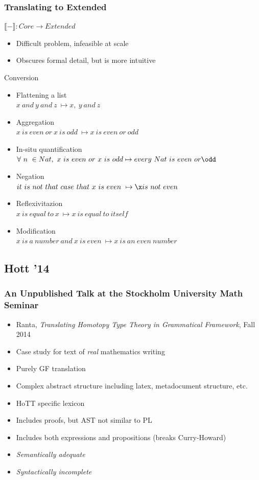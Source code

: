 \documentclass[9pt]{beamer}
\begin{document}
\begin{frame}
\frametitle{Translating to Extended}

$\llbracket - \rrbracket : Core \to Extended$
\begin{itemize}
\item Difficult problem, infeasible at scale
\item Obscures formal detail, but is more intuitive 
\end{itemize}

\begin{exampleblock}{Conversion}
\begin{itemize}

\item Flattening a list \\
  $x\ and\ y\ and\ z\ \mapsto x,\ y\ and\ z$
\item Aggregation \\
  $x\ is\ even\ or\ x\ is\ odd\ \mapsto x\ is\ even\ or\ odd$
\item In-situ quantification \\
  $\forall\ n\ \in Nat,\ x\ is\ even\ or\ x\ is\ odd \mapsto every\ Nat\ is\ even\ or \odd$
\item Negation \\
  $it\ is\ not\ that\ case\ that\ x\ is\ even\ \mapsto \x is\ not\ even$
\item Reflexivitazion \\
  $x\ is\ equal\ to\ x\ \mapsto x\ is\ equal\ to\ itself$
\item Modification \\
  $x\ is\ a\ number\ and\ x\ is\ even\ \mapsto x\ is\ an\ even\ number$
\end{itemize}
\end{exampleblock}
\end{frame}


\subsection{Hott '14}

\begin{frame}
\frametitle{An Unpublished Talk at the Stockholm University Math Seminar}

\begin{itemize}
\item Ranta, \emph{Translating Homotopy Type Theory in Grammatical Framework},
  Fall 2014
\item Case study for text of \emph{real} mathematics writing
\item Purely GF translation
\item Complex abstract structure including latex, metadocument structure, etc.
\item HoTT specific lexicon
\item Includes proofs, but AST not similar to PL
\item Includes both expressions and propositions (breaks Curry-Howard)
\item \emph{Semantically adequate}
\item \emph{Syntactically incomplete}
\end{itemize}
\end{frame}
\end{document}
